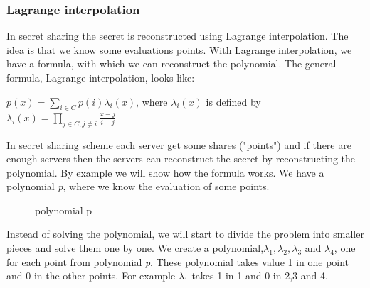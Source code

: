 \subsubsection{Lagrange interpolation}
In secret sharing the secret is reconstructed using Lagrange interpolation. The idea is that we know some evaluations points. With Lagrange interpolation, we have a formula, with which we can reconstruct the polynomial.
The general formula, Lagrange interpolation, looks like:

\begin{defi}
\begin{math}p(x)=\sum\limits_{i \in C} p(i)\lambda_i(x)\end{math}, where $\lambda_i(x)$ is defined by \begin{math} \lambda_i(x)=\prod\limits_{j\in C,j\neq i}  \frac{x-j}{i-j} \end{math}
\end{defi}

\noindent
In secret sharing scheme each server get some shares ("points") and if there are enough servers then the servers can reconstruct the secret by reconstructing the polynomial. By example we will show how the formula works.  We have a polynomial \textit{p}, where we know the evaluation of some points.

\begin{figure}[H]
    \centering
    \caption{polynomial p}
\end{figure}

\noindent
Instead of solving the polynomial, we will start to divide the problem into smaller pieces and solve them one by one. We create a polynomial,\begin{math} \lambda_1, \lambda_2, \lambda_3\end{math} and \begin{math}\lambda_4\end{math}, one for each point from polynomial \textit{p}. These polynomial takes value 1 in one point and 0 in the other points. For example \begin{math} \lambda_1\end{math} takes 1 in 1 and 0 in 2,3 and 4.

